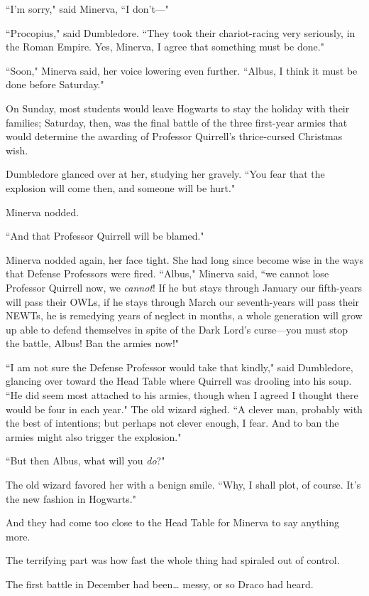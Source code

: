 ``I'm sorry," said Minerva, ``I don't—"

``Procopius," said Dumbledore. ``They took their chariot-racing very seriously, in the Roman Empire. Yes, Minerva, I agree that something must be done."

``Soon," Minerva said, her voice lowering even further. ``Albus, I think it must be done before Saturday."

On Sunday, most students would leave Hogwarts to stay the holiday with their families; Saturday, then, was the final battle of the three first-year armies that would determine the awarding of Professor Quirrell's thrice-cursed Christmas wish.

Dumbledore glanced over at her, studying her gravely. ``You fear that the explosion will come then, and someone will be hurt."

Minerva nodded.

``And that Professor Quirrell will be blamed."

Minerva nodded again, her face tight. She had long since become wise in the ways that Defense Professors were fired. ``Albus," Minerva said, ``we cannot lose Professor Quirrell now, we \emph{cannot}! If he but stays through January our fifth-years will pass their OWLs, if he stays through March our seventh-years will pass their NEWTs, he is remedying years of neglect in months, a whole generation will grow up able to defend themselves in spite of the Dark Lord's curse—you must stop the battle, Albus! Ban the armies now!"

``I am not sure the Defense Professor would take that kindly," said Dumbledore, glancing over toward the Head Table where Quirrell was drooling into his soup. ``He did seem most attached to his armies, though when I agreed I thought there would be four in each year." The old wizard sighed. ``A clever man, probably with the best of intentions; but perhaps not clever enough, I fear. And to ban the armies might also trigger the explosion."

``But then Albus, what will you \emph{do}?"

The old wizard favored her with a benign smile. ``Why, I shall plot, of course. It's the new fashion in Hogwarts."

And they had come too close to the Head Table for Minerva to say anything more.

\later

The terrifying part was how fast the whole thing had spiraled out of control.

The first battle in December had been{\ldots} messy, or so Draco had heard.

